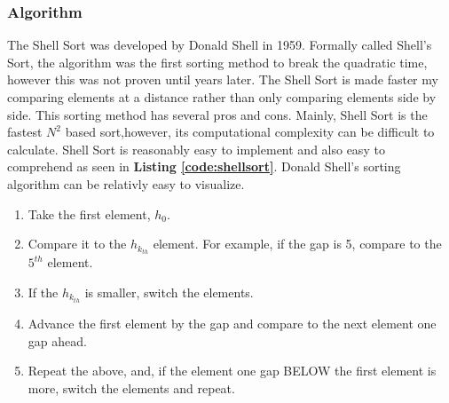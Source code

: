 \documentclass{article}
\begin{document}
   \subsubsection{Algorithm}
        The Shell Sort was developed by Donald Shell in 1959. Formally called
        Shell's Sort, the algorithm was the first sorting method to break the 
        quadratic time, however this was not proven until years later. The 
        Shell Sort is made faster my comparing elements at a distance rather 
        than only comparing elements side by side. This sorting method has
        several pros and cons\cite{introalg}. Mainly, Shell Sort is the
        fastest $N^2$ based sort,however, its computational complexity can be
        difficult to calculate\cite{princton}. Shell Sort is reasonably easy to
        implement and also easy to comprehend as seen in \textbf{Listing
        \ref{code:shellsort}}. Donald Shell's sorting algorithm can be
        relativly easy to visualize.
                \begin{enumerate}
            \item Take the first element, $h_0$.
            \item Compare it to the $h_{k_{th}}$ element. For example, if the 
            gap is 5, compare to the $5^{th}$ element. 
            \item If the $h_{k_{th}}$ is smaller, switch the elements.
            \item Advance the first element by the gap and compare to the next 
            element one gap ahead.
            \item Repeat the above, and, if the element one gap BELOW the first
            element is more, switch the elements and repeat.
        \end{enumerate}
\end{document}
